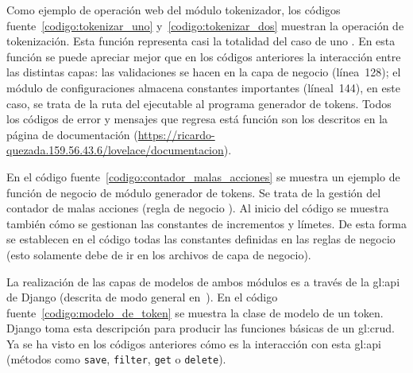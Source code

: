 Como ejemplo de operación web del módulo tokenizador, los códigos
fuente~\ref{codigo:tokenizar_uno} y~\ref{codigo:tokenizar_dos} muestran la
operación de tokenización. Esta función representa casi la totalidad del caso
de uno . En esta función se puede apreciar
mejor que en los códigos anteriores la interacción entre las distintas capas:
las validaciones se hacen en la capa de negocio (línea~128); el módulo de
configuraciones almacena constantes importantes (líneal~144), en este caso, se
trata de la ruta del ejecutable al programa generador de tokens. Todos los
códigos de error y mensajes que regresa está función son los descritos en la
página de documentación
(\url{https://ricardo-quezada.159.56.43.6/lovelace/documentacion}).



En el código fuente~\ref{codigo:contador_malas_acciones} se muestra un ejemplo
de función de negocio de módulo generador de tokens. Se trata de la gestión del
contador de malas acciones (regla de negocio ).
Al inicio del código se muestra también cómo se gestionan las constantes de
incrementos y límetes. De esta forma se establecen en el código todas las
constantes definidas en las reglas de negocio (esto solamente debe de ir en los
archivos de capa de negocio).


La realización de las capas de modelos de ambos módulos es a través de la
\gls{gl:api} de Django (descrita de modo general en~\cite{django_modelos}). En
el código fuente~\ref{codigo:modelo_de_token} se muestra la clase de modelo de
un token. Django toma esta descripción para producir las funciones básicas de
un \gls{gl:crud}. Ya se ha visto en los códigos anteriores cómo es la
interacción con esta \gls{gl:api} (métodos como \texttt{save}, \texttt{filter},
\texttt{get} o \texttt{delete}).



